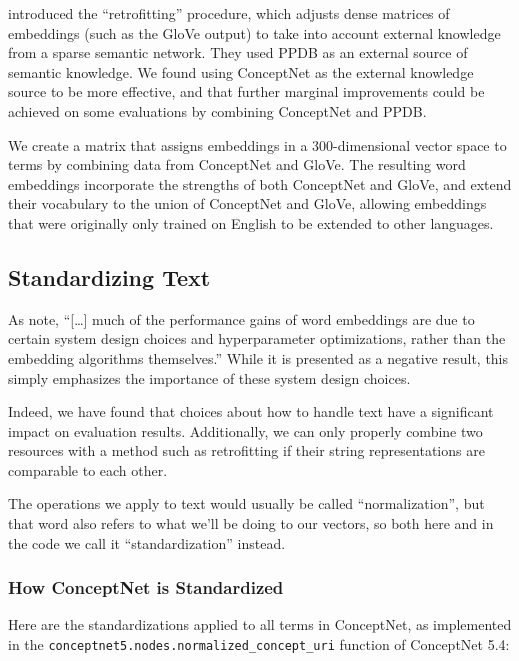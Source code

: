 \documentclass[letterpaper]{article}
\begin{document}
 introduced the ``retrofitting'' procedure,
which adjusts dense matrices of embeddings (such as the GloVe output) to take
into account external knowledge from a sparse semantic network. They used PPDB
\cite{ganitkevitch2013ppdb} as an external source of semantic knowledge. We
found using ConceptNet as the external knowledge source to be more effective,
and that further marginal improvements could be achieved on some evaluations by
combining ConceptNet and PPDB.

We create a matrix that assigns embeddings in a 300-dimensional vector
space to terms by combining data from ConceptNet and GloVe. The resulting word
embeddings incorporate the strengths of both ConceptNet and GloVe, and extend
their vocabulary to the union of ConceptNet and GloVe, allowing embeddings that
were originally only trained on English to be extended to other languages.

\subsection{Standardizing Text}

As  note,
``[\ldots] much of the performance gains of word embeddings are due to certain
system design choices and hyperparameter optimizations, rather than the
embedding algorithms themselves.'' While it is presented as a negative result,
this simply emphasizes the importance of these system design choices.

Indeed, we have found that choices about how to handle text have a significant
impact on evaluation results. Additionally, we can only properly combine two
resources with a method such as retrofitting if their string representations
are comparable to each other.

The operations we apply to text would usually be called ``normalization'',
but that word also refers to what we'll be doing to our vectors, so both
here and in the code we call it ``standardization'' instead.

\subsubsection{How ConceptNet is Standardized}

Here are the standardizations applied to all terms in ConceptNet, as
implemented in the {\tt conceptnet5.nodes.normalized\_concept\_uri} function
of ConceptNet 5.4:
\end{document}
